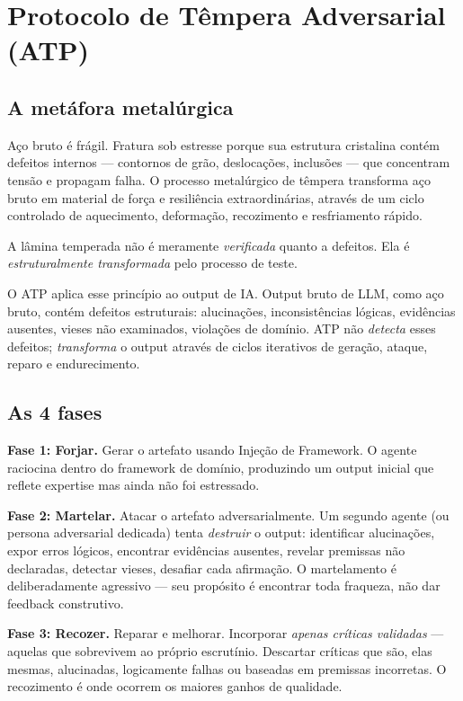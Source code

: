 \documentclass[12pt,a4paper]{article}
\begin{document}
\section{Protocolo de Têmpera Adversarial (ATP)}
\label{sec:atp}

\subsection{A metáfora metalúrgica}

Aço bruto é frágil. Fratura sob estresse porque sua estrutura cristalina contém defeitos internos --- contornos de grão, deslocações, inclusões --- que concentram tensão e propagam falha. O processo metalúrgico de têmpera transforma aço bruto em material de força e resiliência extraordinárias, através de um ciclo controlado de aquecimento, deformação, recozimento e resfriamento rápido.

A lâmina temperada não é meramente \emph{verificada} quanto a defeitos. Ela é \emph{estruturalmente transformada} pelo processo de teste.

O ATP aplica esse princípio ao output de IA. Output bruto de LLM, como aço bruto, contém defeitos estruturais: alucinações, inconsistências lógicas, evidências ausentes, vieses não examinados, violações de domínio. ATP não \emph{detecta} esses defeitos; \emph{transforma} o output através de ciclos iterativos de geração, ataque, reparo e endurecimento.

\subsection{As 4 fases}

\textbf{Fase 1: Forjar.} Gerar o artefato usando Injeção de Framework. O agente raciocina dentro do framework de domínio, produzindo um output inicial que reflete expertise mas ainda não foi estressado.

\textbf{Fase 2: Martelar.} Atacar o artefato adversarialmente. Um segundo agente (ou persona adversarial dedicada) tenta \emph{destruir} o output: identificar alucinações, expor erros lógicos, encontrar evidências ausentes, revelar premissas não declaradas, detectar vieses, desafiar cada afirmação. O martelamento é deliberadamente agressivo --- seu propósito é encontrar toda fraqueza, não dar feedback construtivo.

\textbf{Fase 3: Recozer.} Reparar e melhorar. Incorporar \emph{apenas críticas validadas} --- aquelas que sobrevivem ao próprio escrutínio. Descartar críticas que são, elas mesmas, alucinadas, logicamente falhas ou baseadas em premissas incorretas. O recozimento é onde ocorrem os maiores ganhos de qualidade.
\end{document}
